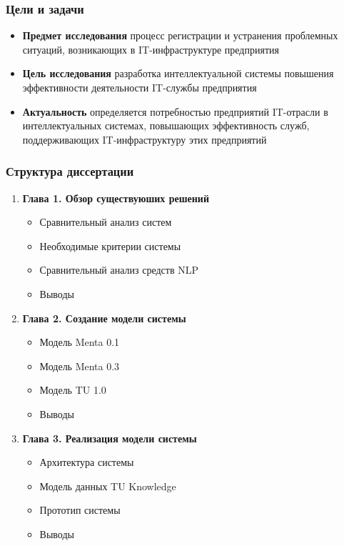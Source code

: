 \documentclass[14pt]{beamer}
\begin{document}
\begin{frame}
\frametitle{Цели и задачи}
\begin{itemize}
  \item \textbf{Предмет исследования} процесс регистрации и устранения проблемных ситуаций, возникающих в IT-инфраструктуре предприятия 
  \item \textbf{Цель исследования}  разработка интеллектуальной системы повышения эффективности деятельности IT-службы предприятия
  \item \textbf{Актуальность} определяется потребностью предприятий IT-отрасли в интеллектуальных системах, повышающих эффективность служб, поддерживающих IT-инфраструктуру этих предприятий
\end{itemize}
\end{frame}







\begin{frame}
\frametitle{Структура диссертации}
\begin{enumerate}
  \item \textbf{Глава 1. Обзор существуюших решений}
  \begin{itemize}
    \item Сравнительный анализ систем
    \item Необходимые критерии системы
    \item Сравнительный анализ средств NLP
    \item Выводы
  \end{itemize}
  \item \textbf{Глава 2. Создание модели системы}
  \begin{itemize}
    \item Модель Menta 0.1
    \item Модель Menta 0.3
    \item Модель TU 1.0
    \item Выводы
  \end{itemize}
  \item \textbf{Глава 3. Реализация модели системы}
  \begin{itemize}
    \item Архитектура системы
    \item Модель данных TU Knowledge
    \item Прототип системы
    \item Выводы
  \end{itemize}
 \end{enumerate}
\end{frame}
\end{document}
